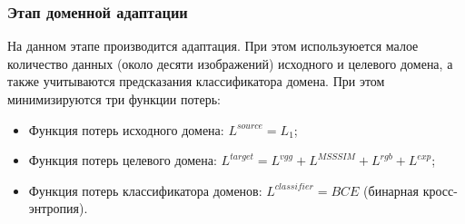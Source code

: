 \subsubsection{Этап доменной адаптации}

На данном этапе производится адаптация. При этом используюется малое количество данных (около десяти изображений) исходного и целевого домена, а также учитываются предсказания классификатора домена. При этом минимизируются три функции потерь:
\begin{itemize}
    \item Функция потерь исходного домена: $L^{source}=L_1$;
    \item Функция потерь целевого домена: $L^{target}=L^{vgg} + L^{MSSSIM} + L^{rgb} + L^{exp}$;
    \item Функция потерь классификатора доменов: $L^{classifier}=BCE$ (бинарная кросс-энтропия).
\end{itemize}

